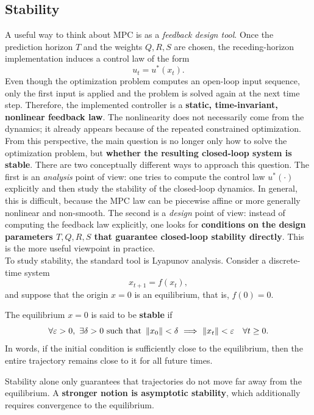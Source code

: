 \subsection{Stability}

A useful way to think about MPC is as a \emph{feedback design tool}. Once the prediction horizon $T$ and the weights $Q,R,S$ are chosen, the receding-horizon implementation induces a control law of the form
\[
u_t = u^*(x_t).
\]
Even though the optimization problem computes an open-loop input sequence, only the first input is applied and the problem is solved again at the next time step. Therefore, the implemented controller is a \textbf{static, time-invariant, nonlinear feedback law}. The nonlinearity does not necessarily come from the dynamics; it already appears because of the repeated constrained optimization.\\
From this perspective, the main question is no longer only how to solve the optimization problem, but \textbf{whether the resulting closed-loop system is stable}. There are two conceptually different ways to approach this question. The first is an \emph{analysis} point of view: one tries to compute the control law $u^*(\cdot)$ explicitly and then study the stability of the closed-loop dynamics. In general, this is difficult, because the MPC law can be piecewise affine or more generally nonlinear and non-smooth. The second is a \emph{design} point of view: instead of computing the feedback law explicitly, one looks for \textbf{conditions on the design parameters $T,Q,R,S$ that guarantee closed-loop stability directly}. This is the more useful viewpoint in practice.\\

To study stability, the standard tool is Lyapunov analysis. Consider a discrete-time system
\[
x_{t+1}=f(x_t),
\]
and suppose that the origin $x=0$ is an equilibrium, that is, $f(0)=0$.

\begin{theorembox}
The equilibrium $x=0$ is said to be \textbf{stable} if
\[
\forall \varepsilon > 0, \ \exists \delta > 0 \text{ such that } \norm{x_0}<\delta
\ \Longrightarrow\ 
\norm{x_t}<\varepsilon \quad \forall t\geq 0.
\]
In words, if the initial condition is sufficiently close to the equilibrium, then the entire trajectory remains close to it for all future times.
\end{theorembox}

Stability alone only guarantees that trajectories do not move far away from the equilibrium. A \textbf{stronger notion is asymptotic stability}, which additionally requires convergence to the equilibrium.

